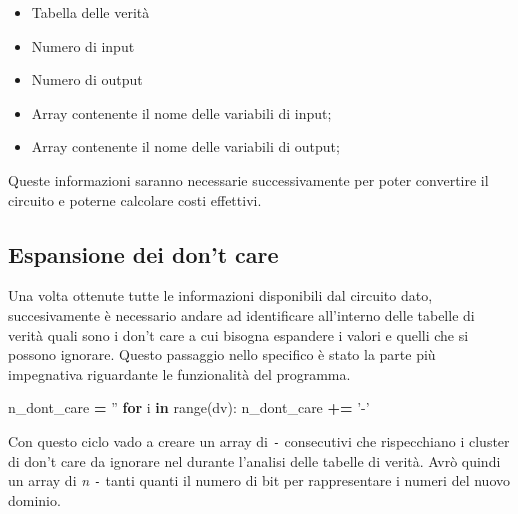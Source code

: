 \documentclass[italian,]{book}
\newenvironment{Shaded}{\begin{snugshade}}{\end{snugshade}}
\newcommand{\BuiltInTok}[1]{#1}
\newcommand{\ControlFlowTok}[1]{\textcolor[rgb]{0.13,0.29,0.53}{\textbf{#1}}}
\newcommand{\KeywordTok}[1]{\textcolor[rgb]{0.13,0.29,0.53}{\textbf{#1}}}
\newcommand{\NormalTok}[1]{#1}
\newcommand{\OperatorTok}[1]{\textcolor[rgb]{0.81,0.36,0.00}{\textbf{#1}}}
\newcommand{\StringTok}[1]{\textcolor[rgb]{0.31,0.60,0.02}{#1}}
\providecommand{\tightlist}{%
  \setlength{\itemsep}{0pt}\setlength{\parskip}{0pt}}
\begin{document}
\begin{itemize}
\tightlist
\item
  Tabella delle verità
\item
  Numero di input
\item
  Numero di output
\item
  Array contenente il nome delle variabili di input;
\item
  Array contenente il nome delle variabili di output;
\end{itemize}

Queste informazioni saranno necessarie successivamente per poter convertire il circuito e poterne calcolare costi effettivi.

\newpage

\hypertarget{espansione-dei-dont-care}{%
\subsection{Espansione dei don't care}\label{espansione-dei-dont-care}}

Una volta ottenute tutte le informazioni disponibili dal circuito dato, succesivamente è necessario andare ad identificare all'interno delle tabelle di verità quali sono i don't care a cui bisogna espandere i valori e quelli che si possono ignorare. Questo passaggio nello specifico è stato la parte più impegnativa riguardante le funzionalità del programma.

\begin{Shaded}
\begin{Highlighting}[]
\NormalTok{n_dont_care }\OperatorTok{=} \StringTok{''}
  \ControlFlowTok{for}\NormalTok{ i }\KeywordTok{in} \BuiltInTok{range}\NormalTok{(dv):}
\NormalTok{    n_dont_care }\OperatorTok{+=} \StringTok{'-'}
\end{Highlighting}
\end{Shaded}

Con questo ciclo vado a creare un array di \texttt{-} consecutivi che rispecchiano i cluster di don't care da ignorare nel durante l'analisi delle tabelle di verità. Avrò quindi un array di \emph{n} \texttt{-} tanti quanti il numero di bit per rappresentare i numeri del nuovo dominio.
\end{document}
